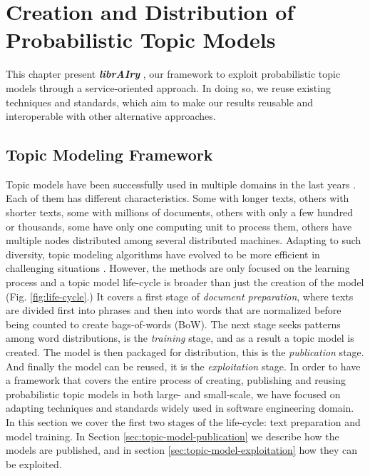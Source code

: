 

\chapter{Creation and Distribution of Probabilistic Topic Models}\label{ch:scalability}

\graphicspath{{scalability/figures/}}


This chapter present \textit{\textbf{librAIry}} \citep{Badenes-Olmedo2017}, our framework to exploit probabilistic topic models through a service-oriented approach. In doing so, we reuse existing techniques and standards, which aim to make our results reusable and interoperable with other alternative approaches.


\section{Topic Modeling Framework}
\label{sec:topic-model-framework}


Topic models have been successfully used in multiple domains in the last years \citep{TapiNzali2017, ONeill2017, Greene2016, He2017}. Each of them has different characteristics. Some with longer texts, others with shorter texts, some with millions of documents, others with only a few hundred or thousands, some have only one computing unit to process them, others have multiple nodes distributed among several distributed machines. Adapting to such diversity, topic modeling algorithms have evolved to be more efficient in challenging situations \citep{10.1145/2736277.2741106}. However, the methods are only focused on the learning process and a topic model life-cycle is broader than just the creation of the model (Fig. \ref{fig:life-cycle}.) It covers a first stage of \textit{document preparation}, where texts are divided first into phrases and then into words that are normalized before being counted to create bags-of-words (BoW). The next stage seeks patterns among word distributions, is the \textit{training} stage, and as a result a topic model is created. The model is then packaged for distribution, this is the \textit{publication} stage. And finally the model can be reused, it is the \textit{exploitation} stage. In order to have a framework that covers the entire process of creating, publishing and reusing probabilistic topic models in both large- and small-scale, we have focused on adapting techniques and standards widely used in software engineering domain. In this section we cover the first two stages of the life-cycle: text preparation and model training. In Section \ref{sec:topic-model-publication} we describe how the models are published, and in section \ref{sec:topic-model-exploitation} how they can be exploited. 


